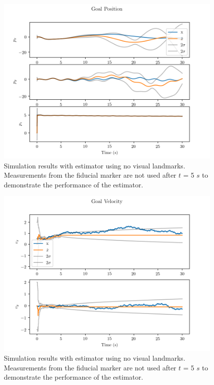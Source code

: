 \begin{figure}
  \centering
  \includegraphics[scale=0.5]{plots/no_lms_gp.png}
  \caption{Simulation results with estimator using no visual
  landmarks. Measurements from the fiducial marker are not used after $t$ = 5
$s$ to demonstrate the performance of the estimator.}
  \label{fig:no_lms_gp}
\end{figure}

\begin{figure}
  \centering
  \includegraphics[scale=0.5]{plots/no_lms_gv.png}
  \caption{Simulation results with estimator using no visual
  landmarks. Measurements from the fiducial marker are not used after $t$ = 5
$s$ to demonstrate the performance of the estimator.}
  \label{fig:no_lms_gv}
\end{figure}

